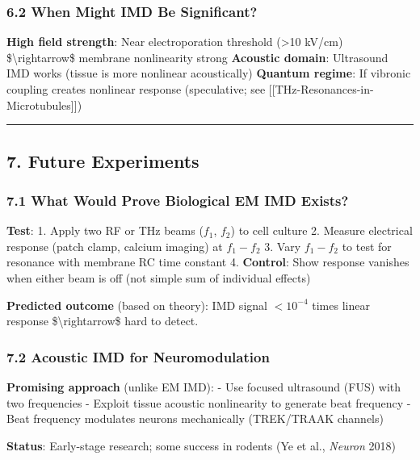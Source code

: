 \subsubsection{6.2 When Might IMD Be
Significant?}\label{when-might-imd-be-significant}

\textbf{High field strength}: Near electroporation threshold
(\textgreater10 kV/cm) \$\textbackslash rightarrow\$ membrane
nonlinearity strong \textbf{Acoustic domain}: Ultrasound IMD works
(tissue is more nonlinear acoustically) \textbf{Quantum regime}: If
vibronic coupling creates nonlinear response (speculative; see
{[}{[}THz-Resonances-in-Microtubules{]}{]})

\begin{center}\rule{0.5\linewidth}{0.5pt}\end{center}

\subsection{7. Future Experiments}\label{future-experiments}

\subsubsection{7.1 What Would Prove Biological EM IMD
Exists?}\label{what-would-prove-biological-em-imd-exists}

\textbf{Test}: 1. Apply two RF or THz beams (\(f_1\), \(f_2\)) to cell
culture 2. Measure electrical response (patch clamp, calcium imaging) at
\(f_1 - f_2\) 3. Vary \(f_1 - f_2\) to test for resonance with membrane
RC time constant 4. \textbf{Control}: Show response vanishes when either
beam is off (not simple sum of individual effects)

\textbf{Predicted outcome} (based on theory): IMD signal \(<10^{-4}\)
times linear response \$\textbackslash rightarrow\$ hard to detect.

\subsubsection{7.2 Acoustic IMD for
Neuromodulation}\label{acoustic-imd-for-neuromodulation}

\textbf{Promising approach} (unlike EM IMD): - Use focused ultrasound
(FUS) with two frequencies - Exploit tissue acoustic nonlinearity to
generate beat frequency - Beat frequency modulates neurons mechanically
(TREK/TRAAK channels)

\textbf{Status}: Early-stage research; some success in rodents (Ye et
al., \emph{Neuron} 2018)

